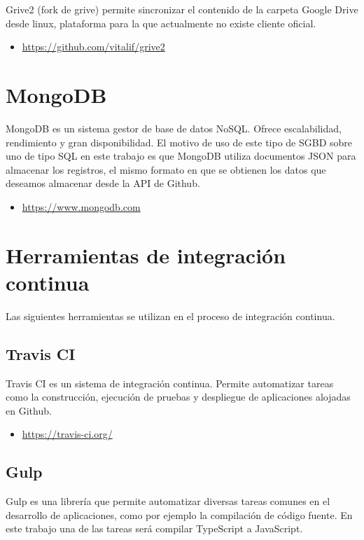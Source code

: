 Grive2 (fork de grive) permite sincronizar el contenido de la carpeta Google Drive desde linux, plataforma para la que actualmente no existe cliente oficial.

\begin{itemize}
	\item \url{https://github.com/vitalif/grive2}
\end{itemize}

\section{MongoDB}

MongoDB es un sistema gestor de base de datos NoSQL. Ofrece escalabilidad, rendimiento y gran disponibilidad. El motivo de uso de este tipo de SGBD sobre uno de tipo SQL en este trabajo es que MongoDB utiliza documentos JSON para almacenar los registros, el mismo formato en que se obtienen los datos que deseamos almacenar desde la API de Github.

\begin{itemize}
	\item \url{https://www.mongodb.com}
\end{itemize}

\section{Herramientas de integración continua}

Las siguientes herramientas se utilizan en el proceso de integración continua.

\subsection{Travis CI}

Travis CI es un sistema de integración continua. Permite automatizar tareas como la construcción, ejecución de pruebas y despliegue de aplicaciones alojadas en Github.

\begin{itemize}
	\item \url{https://travis-ci.org/}
\end{itemize}

\subsection{Gulp}

Gulp es una librería que permite automatizar diversas tareas comunes en el desarrollo de aplicaciones, como por ejemplo la compilación de código fuente. En este trabajo una de las tareas será compilar TypeScript a JavaScript.

